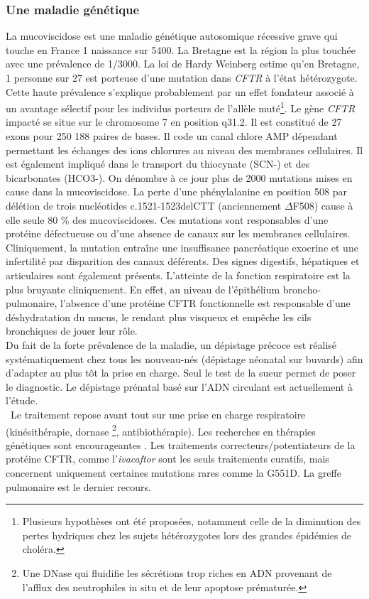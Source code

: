 \documentclass[12pt,a4paper]{article}
\begin{document}
\subsubsection{Une maladie génétique}
La mucoviscidose est une maladie génétique autosomique récessive grave qui touche en France 1 naissance sur 5400\cite{Registredelamuco.org}. La Bretagne est la région la plus touchée avec une prévalence de 1/3000\cite{Registredelamuco.org}.
La loi de Hardy Weinberg estime qu’en Bretagne, 1 personne sur 27 est porteuse d'une mutation dans \textit{CFTR} à l’état hétérozygote. Cette haute prévalence s’explique probablement par un effet fondateur associé à un avantage sélectif pour les individus porteurs de l’allèle muté\footnote{Plusieurs hypothèses ont été proposées, notamment celle de la diminution des pertes hydriques chez les sujets hétérozygotes lors des grandes épidémies de choléra.}.
Le gène \textit{CFTR} impacté se situe sur le chromosome 7 en position q31.2. Il est constitué de 27 exons pour 250 188\cite{OLeary2016} paires de bases. Il code un canal chlore AMP dépendant permettant les échanges des ions chlorures au niveau des membranes cellulaires. Il est également impliqué dans le transport du thiocynate (SCN-) et des bicarbonates (HCO3-)\cite{Quinton2001}.
On dénombre à ce jour plus de 2000 mutations \cite{cftrdb} mises en cause dans la mucoviscidose. La perte d’une phénylalanine en position 508 par délétion de trois nucléotides c.1521-1523delCTT (anciennement $\Delta$F508) cause à elle seule 80 \% des mucoviscidoses\cite{cftrdb}.
Ces mutations sont responsables d’une protéine défectueuse ou d’une absence de canaux sur les membranes cellulaires. \\
Cliniquement, la mutation entraîne une insuffisance pancréatique exocrine et une infertilité par disparition des canaux déférents. Des signes digestifs, hépatiques et articulaires sont également présents.
L'atteinte de la fonction respiratoire est la plus bruyante cliniquement. En effet, au niveau de l’épithélium broncho-pulmonaire, l’absence d’une protéine CFTR fonctionnelle est responsable d’une déshydratation du mucus, le rendant plus visqueux et empêche les cils bronchiques de jouer leur rôle.\\
Du fait de la forte prévalence de la maladie, un dépistage précoce est réalisé systématiquement chez tous les nouveau-nés (dépistage néonatal sur buvards) afin d’adapter au plus tôt la prise en charge. Seul le test de la sueur permet de poser le diagnostic. Le dépistage prénatal basé sur l’ADN circulant est actuellement à l’étude\cite{Guissart2017}.\\\
Le traitement repose avant tout sur une prise en charge respiratoire (kinésithérapie, dornase \footnote{Une DNase qui fluidifie les sécrétions trop riches en ADN provenant de l'afflux des neutrophiles in situ et de leur apoptose prématurée.}, antibiothérapie). Les recherches en thérapies génétiques sont encourageantes \cite{Montier2004}.
Les traitements correcteurs/potentiateurs de la protéine CFTR, comme l'\textit{ivacaftor} sont les seuls traitements curatifs, mais concernent uniquement certaines mutations rares comme la G551D. La greffe pulmonaire est le dernier recours.
\end{document}
